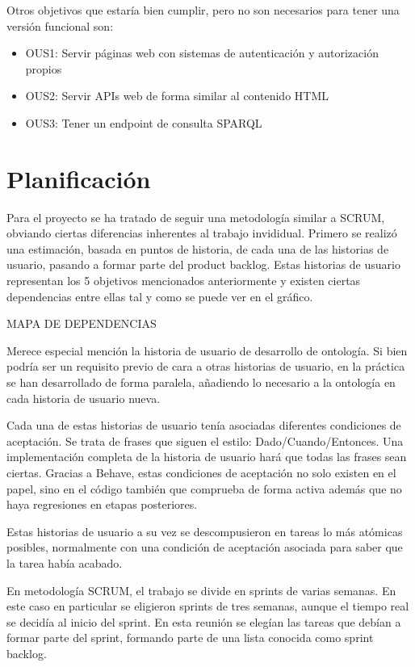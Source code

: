 \documentclass[12pt]{report} %
\begin{document}
Otros objetivos que estaría bien cumplir, pero no son necesarios para tener una versión funcional son:
\begin{itemize}
    \item OUS1: Servir páginas web con sistemas de autenticación y autorización propios
    \item OUS2: Servir APIs web de forma similar al contenido HTML
    \item OUS3: Tener un endpoint de consulta SPARQL
\end{itemize}

\chapter{Planificación}
Para el proyecto se ha tratado de seguir una metodología similar a SCRUM, obviando ciertas diferencias inherentes al trabajo invididual.
Primero se realizó una estimación, basada en puntos de historia, de cada una de las historias de usuario, pasando a formar parte del product backlog.
Estas historias de usuario representan los 5 objetivos mencionados anteriormente y existen ciertas dependencias entre ellas tal y como se puede ver en el gráfico.

MAPA DE DEPENDENCIAS

Merece especial mención la historia de usuario de desarrollo de ontología. Si bien podría ser un requisito previo de cara a otras historias de usuario, en la práctica
se han desarrollado de forma paralela, añadiendo lo necesario a la ontología en cada historia de usuario nueva.

Cada una de estas historias de usuario tenía asociadas diferentes condiciones de aceptación. Se trata de frases que siguen el estilo: Dado/Cuando/Entonces. 
Una implementación completa de la historia de usuario hará que todas las frases sean ciertas. Gracias a Behave, estas condiciones de aceptación no solo existen en el papel, sino en el código también que comprueba de forma activa además que no haya regresiones en etapas posteriores.

Estas historias de usuario a su vez se descompusieron en tareas lo más atómicas posibles, normalmente con una condición de aceptación asociada para saber que la tarea había acabado.

En metodología SCRUM, el trabajo se divide en sprints de varias semanas. En este caso en particular se eligieron sprints de tres semanas, aunque el tiempo real se decidía al inicio del sprint.
En esta reunión se elegían las tareas que debían a formar parte del sprint, formando parte de una lista conocida como sprint backlog.
\end{document}
